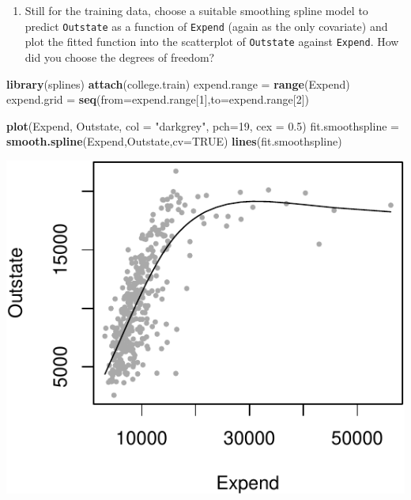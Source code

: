 \documentclass[]{article}
\newenvironment{Shaded}{\begin{snugshade}}{\end{snugshade}}
\newcommand{\DataTypeTok}[1]{\textcolor[rgb]{0.13,0.29,0.53}{#1}}
\newcommand{\DecValTok}[1]{\textcolor[rgb]{0.00,0.00,0.81}{#1}}
\newcommand{\FloatTok}[1]{\textcolor[rgb]{0.00,0.00,0.81}{#1}}
\newcommand{\KeywordTok}[1]{\textcolor[rgb]{0.13,0.29,0.53}{\textbf{#1}}}
\newcommand{\NormalTok}[1]{#1}
\newcommand{\OtherTok}[1]{\textcolor[rgb]{0.56,0.35,0.01}{#1}}
\newcommand{\StringTok}[1]{\textcolor[rgb]{0.31,0.60,0.02}{#1}}
\providecommand{\tightlist}{%
  \setlength{\itemsep}{0pt}\setlength{\parskip}{0pt}}
\begin{document}
\begin{enumerate}
\def\labelenumi{(\roman{enumi})}
\setcounter{enumi}{1}
\tightlist
\item
  Still for the training data, choose a suitable smoothing spline model
  to predict \texttt{Outstate} as a function of \texttt{Expend} (again
  as the only covariate) and plot the fitted function into the
  scatterplot of \texttt{Outstate} against \texttt{Expend}. How did you
  choose the degrees of freedom?
\end{enumerate}

\begin{Shaded}
\begin{Highlighting}[]
\KeywordTok{library}\NormalTok{(splines)}
\KeywordTok{attach}\NormalTok{(college.train)}
\NormalTok{expend.range =}\StringTok{ }\KeywordTok{range}\NormalTok{(Expend)}
\NormalTok{expend.grid =}\StringTok{ }\KeywordTok{seq}\NormalTok{(}\DataTypeTok{from=}\NormalTok{expend.range[}\DecValTok{1}\NormalTok{],}\DataTypeTok{to=}\NormalTok{expend.range[}\DecValTok{2}\NormalTok{])}

\KeywordTok{plot}\NormalTok{(Expend, Outstate, }\DataTypeTok{col =} \StringTok{"darkgrey"}\NormalTok{, }\DataTypeTok{pch=}\DecValTok{19}\NormalTok{, }\DataTypeTok{cex =} \FloatTok{0.5}\NormalTok{)}
\NormalTok{fit.smoothspline =}\StringTok{ }\KeywordTok{smooth.spline}\NormalTok{(Expend,Outstate,}\DataTypeTok{cv=}\OtherTok{TRUE}\NormalTok{)}
\KeywordTok{lines}\NormalTok{(fit.smoothspline)}
\end{Highlighting}
\end{Shaded}

\begin{center}\includegraphics{Compulsory2_Group37_StatLearn_files/figure-latex/2dii-1} \end{center}
\end{document}
